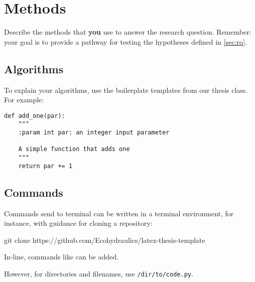 \chapter{Methods} %
\label{ch:methods}

Describe the methods that \textbf{you} use to answer the research question. Remember: your goal is to provide a pathway for testing the hypotheses defined in \autoref{sec:rq}.

\section{Algorithms}

To explain your algorithms, use the boilerplate templates from our thesis class. For example:

\begin{lstlisting}
def add_one(par):
	"""
	:param int par: an integer input parameter
	
	A simple function that adds one
	"""
	return par += 1
\end{lstlisting}


\section{Commands}

Commands send to terminal can be written in a terminal environment, for instance, with guidance for cloning a repository:

\begin{terminal}
	 git clone https://github.com/Ecohydraulics/latex-thesis-template
\end{terminal}

In-line, commands like  can be added.

However, for directories and filenames, use \texttt{/dir/to/code.py}.
